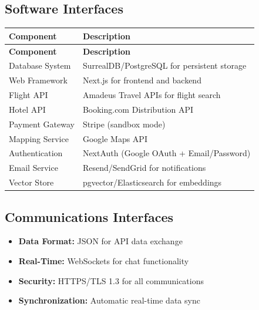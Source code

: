 \documentclass[12pt,a4paper]{article}
\begin{document}
\subsection{Software Interfaces}

\begin{longtable}{|L{4cm}|L{9cm}|}
    \hline
    \textbf{Component} & \textbf{Description} \\
    \hline
    \endfirsthead
    
    \hline
    \textbf{Component} & \textbf{Description} \\
    \hline
    \endhead
    
    Database System & SurrealDB/PostgreSQL for persistent storage \\
    \hline
    Web Framework & Next.js for frontend and backend \\
    \hline
    Flight API & Amadeus Travel APIs for flight search \\
    \hline
    Hotel API & Booking.com Distribution API \\
    \hline
    Payment Gateway & Stripe (sandbox mode) \\
    \hline
    Mapping Service & Google Maps API \\
    \hline
    Authentication & NextAuth (Google OAuth + Email/Password) \\
    \hline
    Email Service & Resend/SendGrid for notifications \\
    \hline
    Vector Store & pgvector/Elasticsearch for embeddings \\
    \hline
\end{longtable}

\subsection{Communications Interfaces}

\begin{itemize}[leftmargin=*, itemsep=0.3em]
    \item \textbf{Data Format:} JSON for API data exchange
    \item \textbf{Real-Time:} WebSockets for chat functionality
    \item \textbf{Security:} HTTPS/TLS 1.3 for all communications
    \item \textbf{Synchronization:} Automatic real-time data sync
\end{itemize}

\newpage 
\end{document}
